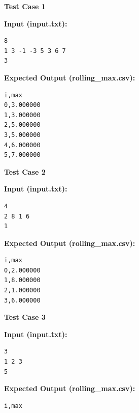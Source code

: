 \textbf{Test Case 1}

\textbf{Input (input.txt):}
\begin{lstlisting}
8
1 3 -1 -3 5 3 6 7
3
\end{lstlisting}

\textbf{Expected Output (rolling\_max.csv):}
\begin{lstlisting}
i,max
0,3.000000
1,3.000000
2,5.000000
3,5.000000
4,6.000000
5,7.000000
\end{lstlisting}

\textbf{Test Case 2}

\textbf{Input (input.txt):}
\begin{lstlisting}
4
2 8 1 6
1
\end{lstlisting}

\textbf{Expected Output (rolling\_max.csv):}
\begin{lstlisting}
i,max
0,2.000000
1,8.000000
2,1.000000
3,6.000000
\end{lstlisting}

\textbf{Test Case 3}

\textbf{Input (input.txt):}
\begin{lstlisting}
3
1 2 3
5
\end{lstlisting}

\textbf{Expected Output (rolling\_max.csv):}
\begin{lstlisting}
i,max
\end{lstlisting}